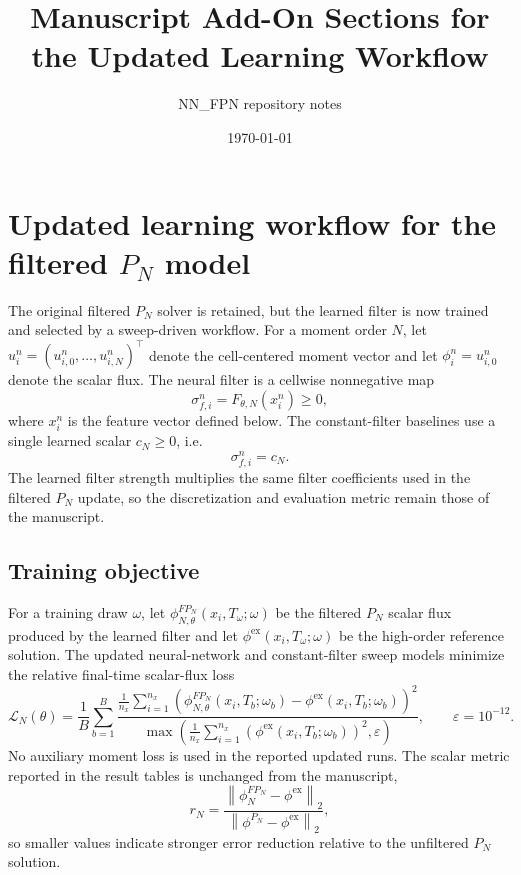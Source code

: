 \documentclass[10pt]{article}
\title{Manuscript Add-On Sections for the Updated Learning Workflow}
\author{NN\_FPN repository notes}
\date{\today}
\newcommand{\PN}{\ensuremath{P_N}}
\newcommand{\FPN}{\ensuremath{FP_N}}
\begin{document}
\maketitle

\section{Updated learning workflow for the filtered \texorpdfstring{$P_N$}{PN} model}
The original filtered \(\PN\) solver is retained, but the learned filter is now
trained and selected by a sweep-driven workflow.  For a moment order \(N\), let
\(u_i^n=(u_{i,0}^n,\ldots,u_{i,N}^n)^\top\) denote the cell-centered moment vector
and let \(\phi_i^n=u_{i,0}^n\) denote the scalar flux.  The neural filter is a
cellwise nonnegative map
\[
  \sigma_{f,i}^n = F_{\theta,N}(x_i^n) \ge 0,
\]
where \(x_i^n\) is the feature vector defined below.  The constant-filter
baselines use a single learned scalar \(c_N\ge 0\), i.e.
\[
  \sigma_{f,i}^n = c_N .
\]
The learned filter strength multiplies the same filter coefficients used in the
filtered \(P_N\) update, so the discretization and evaluation metric remain those
of the manuscript.

\subsection{Training objective}
For a training draw \(\omega\), let \(\phi^{\FPN}_{N,\theta}(x_i,T_\omega;\omega)\)
be the filtered \(P_N\) scalar flux produced by the learned filter and let
\(\phi^{\mathrm{ex}}(x_i,T_\omega;\omega)\) be the high-order reference solution.
The updated neural-network and constant-filter sweep models minimize the
relative final-time scalar-flux loss
\[
  \mathcal{L}_N(\theta)
  = \frac{1}{B}\sum_{b=1}^{B}
    \frac{\frac{1}{n_x}\sum_{i=1}^{n_x}
      \left(\phi^{\FPN}_{N,\theta}(x_i,T_b;\omega_b)
      -\phi^{\mathrm{ex}}(x_i,T_b;\omega_b)\right)^2}
    {\max\!\left(\frac{1}{n_x}\sum_{i=1}^{n_x}
      \left(\phi^{\mathrm{ex}}(x_i,T_b;\omega_b)\right)^2,\varepsilon\right)},
  \qquad \varepsilon=10^{-12} .
\]
No auxiliary moment loss is used in the reported updated runs.  The scalar
metric reported in the result tables is unchanged from the manuscript,
\[
  r_N =
  \frac{\left\|\phi^{\FPN}_N-\phi^{\mathrm{ex}}\right\|_2}
       {\left\|\phi^{P_N}-\phi^{\mathrm{ex}}\right\|_2},
\]
so smaller values indicate stronger error reduction relative to the unfiltered
\(P_N\) solution.
\end{document}
